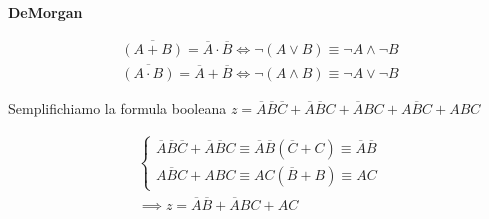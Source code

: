 \begin{thm}
	\textbf{DeMorgan}
	
	\begin{equation*}\begin{aligned}
		\overbar{(A + B)} = \overbar{A} \cdot \overbar{B} \iff \lnot(A \lor B )\equiv \lnot A \land \lnot B \\
		\overbar{(A \cdot B)} = \overbar{A} + \overbar{B} \iff \lnot(A \land B )\equiv \lnot A \lor \lnot B 
	\end{aligned}\end{equation*}
\end{thm} 


\begin{exmp}
	Semplifichiamo la formula booleana $ z = \overbar{A}\overbar{B}\overbar{C} + \overbar{A}\overbar{B}C + \overbar{A}BC + A\overbar{B}C + ABC $
	
	
	\begin{equation*}
	\begin{aligned}
	\begin{cases}
	\overbar{A}\overbar{B}\overbar{C} + \overbar{A}\overbar{B}C \equiv \overbar{A}\overbar{B}(\overbar{C}+C) \equiv \overbar{A}\overbar{B} \\ 
	A\overbar{B}C + ABC \equiv AC(\overbar{B}+B) \equiv AC
	\end{cases} \\
	\implies z = \overbar{A}\overbar{B} + \overbar{A}BC + AC
	\end{aligned}
	\end{equation*}
		
\end{exmp}




